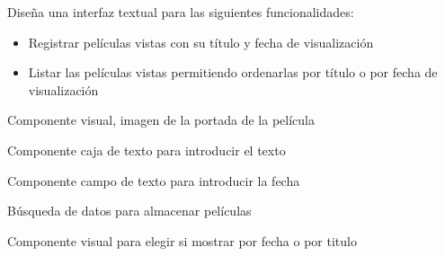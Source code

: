 

\begin{enunciado}
    Diseña una interfaz textual para las siguientes funcionalidades:

    \begin{itemize}
        \item Registrar películas vistas con su título y fecha de visualización
        \item Listar las películas vistas permitiendo ordenarlas por título o por fecha de visualización
    \end{itemize}
\end{enunciado}

\begin{solucion}
    Componente visual, imagen de la portada de la película


    Componente caja de texto para introducir el texto


    Componente campo de texto para introducir la fecha


    Búsqueda de datos para almacenar películas


    Componente visual para elegir si mostrar por fecha o por titulo
\end{solucion}